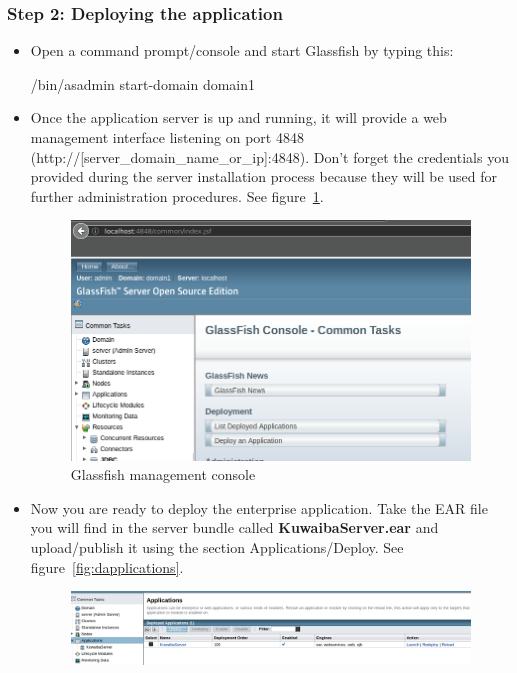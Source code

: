 \documentclass[a4paper]{article}
\begin{document}
			\subsubsection{Step 2: Deploying the application}
			\begin{itemize}
				\item Open a command prompt/console and start Glassfish by typing this:
				\begin{verbbox}
					/bin/asadmin start-domain domain1
				\end{verbbox}
				\begin{figure}[h!]
					\centering	
					\theverbbox
				\end{figure}
				\item Once the application server is up and running, it will provide a web management interface listening on port 4848 (http://[server\_domain\_name\_or\_ip]:4848). Don't forget the credentials you provided during the server installation process because they will be used for further administration procedures. See figure~\ref{fig:gf_mgmconsole}.
				\begin{figure}[h!]
					\includegraphics[width=\linewidth]{img/gf_management_console.jpg} 
					\caption{Glassfish management console}
					\label{fig:gf_mgmconsole}
				\end{figure}		
				\item Now you are ready to deploy the enterprise application. Take the EAR file you will find in the server bundle called \textbf{KuwaibaServer.ear} and upload/publish it using the section Applications/Deploy. See figure~\ref{fig:dapplications}.
				\begin{figure}[h!]
					\includegraphics[width=\linewidth]{img/gf_deployed_applications.jpg} 		

\end{figure}
\end{itemize}
\end{document}
